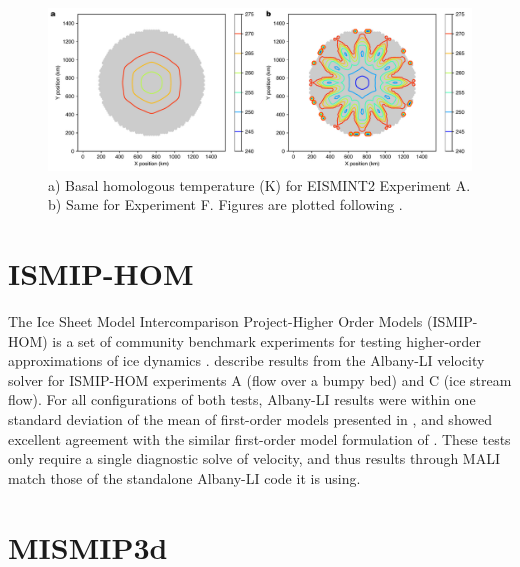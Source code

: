 \begin{figure}[t]
\centering
\includegraphics[width=16.0cm]{landice/figures/eismint_basal_temps.pdf}
\caption{a) Basal homologous temperature (K) for EISMINT2 Experiment A. b) Same for Experiment F.
Figures are plotted following \citet{payne2000}.
}
\label{eismint-spokes}
\end{figure}


\section{ISMIP-HOM}

The Ice Sheet Model Intercomparison Project-Higher Order Models (ISMIP-HOM)
is a set of community benchmark experiments for testing higher-order approximations of ice dynamics \citep{pattyn2008}.
\citet{tezaur2015a} describe results from the Albany-LI velocity solver for ISMIP-HOM 
experiments A (flow over a bumpy bed) and C (ice stream flow).
For all configurations of both tests, Albany-LI results were within one standard deviation of the mean
of first-order models presented in \citet{pattyn2008}, 
and showed excellent agreement with the similar first-order model formulation of \citet{perego2012}.
These tests only require a single diagnostic solve of velocity,
and thus results through MALI match those of the standalone Albany-LI code it is using.

\section{MISMIP3d}

